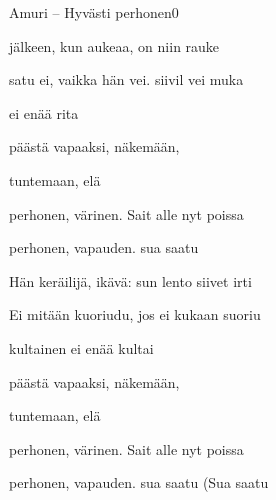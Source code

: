 \documentclass[11pt,a4paper]{article}
\begin{document}
\thispagestyle{empty}
\begin{mysong}{Amuri – Hyvästi perhonen}{0}

\begin{SBVerse}
   jälkeen, kun  aukeaa, on  niin
   rauke

   satu ei, vaikka  hän vei. 
  siivil vei muka

    ei  enää
   rita

   päästä vapaaksi,  näkemään,

   tuntemaan,  elä
\end{SBVerse}

\begin{SBChorus}
   perhonen,  värinen. Sait  alle
   nyt poissa 

   perhonen,  vapauden.
   sua saatu 
\end{SBChorus}


\begin{SBVerse}
  Hän  keräilijä,  ikävä:  sun lento
   siivet irti 

  Ei  mitään  kuoriudu, jos ei 
  kukaan  suoriu

    kultainen ei  enää
   kultai

   päästä vapaaksi,  näkemään,

   tuntemaan,  elä
\end{SBVerse}

\begin{SBChorus}
   perhonen,  värinen. Sait  alle
   nyt poissa 

   perhonen,  vapauden.
   sua saatu  (Sua saatu
\end{SBChorus}


\end{mysong}
\end{document}
